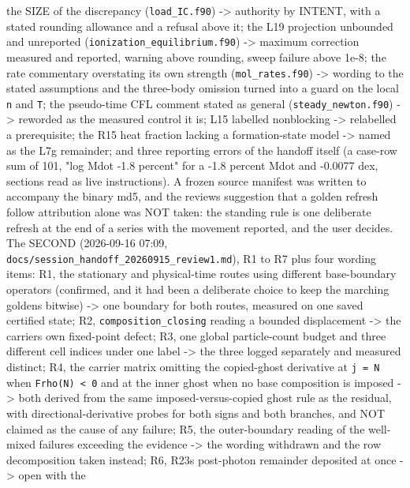 \documentclass[english,a4paper]{my_memo}
\begin{document}
\begin{itemize}
  the SIZE of the discrepancy (\texttt{load\_IC.f90}) -\textgreater{} authority by INTENT, with a
  stated rounding allowance and a refusal above it; the L19 projection
  unbounded and unreported (\texttt{ionization\_equilibrium.f90}) -\textgreater{} maximum correction
  measured and reported, warning above rounding, sweep failure above 1e-8; the
  rate commentary overstating its own strength (\texttt{mol\_rates.f90}) -\textgreater{} wording to
  the stated assumptions and the three-body omission turned into a guard on the
  local \texttt{n} and \texttt{T}; the pseudo-time CFL comment stated as general
  (\texttt{steady\_newton.f90}) -\textgreater{} reworded as the measured control it is; L15 labelled
  nonblocking -\textgreater{} relabelled a prerequisite; the R15 heat fraction lacking a
  formation-state model -\textgreater{} named as the L7g remainder; and three reporting
  errors of the handoff itself (a case-row sum of 101, "log Mdot -1.8 percent"
  for a -1.8 percent Mdot and -0.0077 dex, sections read as live instructions).
  A frozen source manifest was written to accompany the binary md5, and the
  review\textquotesingle s suggestion that a golden refresh follow attribution alone was NOT
  taken: the standing rule is one deliberate refresh at the end of a series
  with the movement reported, and the user decides. The SECOND (2026-09-16
  07:09, \texttt{docs/session\_handoff\_20260915\_review1.md}), R1 to R7 plus four
  wording items: R1, the stationary and physical-time routes using different
  base-boundary operators (confirmed, and it had been a deliberate choice to
  keep the marching goldens bitwise) -\textgreater{} one boundary for both routes, measured
  on one saved certified state; R2, \texttt{composition\_closing} reading a bounded
  displacement -\textgreater{} the carrier\textquotesingle s own fixed-point defect; R3, one global
  particle-count budget and three different cell indices under one label -\textgreater{} the
  three logged separately and measured distinct; R4, the carrier matrix
  omitting the copied-ghost derivative at \texttt{j\ =\ N} when \texttt{Frho(N)\ \textless{}\ 0} and at the
  inner ghost when no base composition is imposed -\textgreater{} both derived from the same
  imposed-versus-copied ghost rule as the residual, with directional-derivative
  probes for both signs and both branches, and NOT claimed as the cause of any
  failure; R5, the outer-boundary reading of the well-mixed failures exceeding
  the evidence -\textgreater{} the wording withdrawn and the row decomposition taken
  instead; R6, R23\textquotesingle s post-photon remainder deposited at once -\textgreater{} open with the

\end{itemize}
\end{document}
